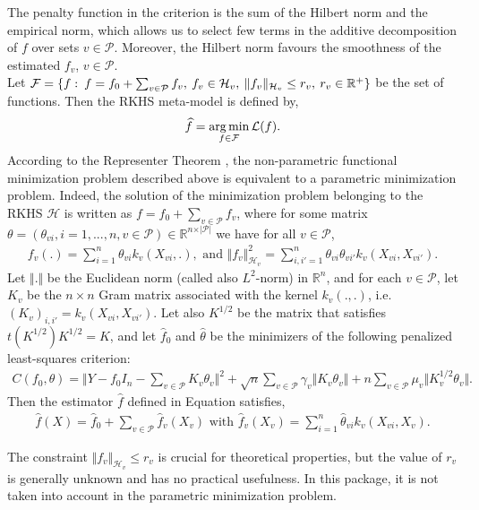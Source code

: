 The penalty function in the criterion  is the sum of the Hilbert norm and the empirical norm, which allows us to select few terms in the additive decomposition of $f$ over sets $v \in \mathcal{P}$. Moreover, the Hilbert norm favours the smoothness of the estimated $f_v$, $v \in \mathcal{P}$.\\ 
Let $\mathcal{F} = \{ f:\: f=f_{0} + \sum_{v\in \mathcal{P}} f_{v},\: f_v \in \mathcal{H}_{v},\: \|f_v\|_{\mathcal{H}_v} \leq r_v,\:r_v\in\mathbb{R}^{+} \}$ be the set of functions.
Then the RKHS meta-model is defined by,
\begin{equation}
\label{ch3prediction}
\widehat{f}=\operatorname*{arg\,min}_{f\in\mathcal{F}}\mathcal{L}(f).
\end{equation}
According to the Representer Theorem \citep{kimeldorf1970}, the non-parametric functional minimization problem described above is equivalent to a parametric minimization problem. Indeed, the solution of the minimization problem  belonging to the RKHS $\mathcal{H}$ is written as $f=f_0+\sum_{v\in\mathcal{P}}f_v$, where for some matrix $\theta=(\theta_{vi},i=1,...,n,v\in\mathcal{P})\in\mathbb{R}^{n\times\vert\mathcal{P}\vert}$ we have for all $v\in\mathcal{P}$, 
\begin{align}
\label{normhvdef}
f_v(.)=\sum_{i=1}^n\theta_{vi}k_v(X_{vi},.),\mbox{ and }\Vert f_v\Vert^2_{\mathcal{H}_v}=\sum_{i,i'=1}^n\theta_{vi}\theta_{vi'}k_v(X_{vi},X_{vi'}).
\end{align}
Let $\Vert.\Vert$ be the Euclidean norm (called also $L^2$-norm) in $\mathbb{R}^n$, and for each $v\in\mathcal{P}$, let $K_v$ be the $n\times n$ Gram matrix associated with the kernel $k_v(.,.)$, i.e. $(K_v)_{i,i'}=k_v(X_{vi},X_{vi'})$. Let also $K^{1/2}$ be the matrix that satisfies $t(K^{1/2})K^{1/2}=K$, and let $\widehat{f}_0$ and $\widehat{\theta}$ be the minimizers of the following penalized least-squares criterion:
\begin{align*}
C(f_0,\theta)=\Vert Y-f_0 I_n-\sum_{v\in\mathcal{P}}K_v\theta_v\Vert^2+\sqrt{n}\sum_{v\in\mathcal{P}}\gamma_v\Vert K_v\theta_v\Vert+n\sum_{v\in\mathcal{P}}\mu_v\Vert K_v^{1/2}\theta_v\Vert.
\end{align*}
Then the estimator $\widehat{f}$ defined in Equation  satisfies, 
\begin{align*}
\widehat{f}(X)=\widehat{f}_0+\sum_{v\in\mathcal{P}}\widehat{f}_v(X_v)\mbox{ with }\widehat{f}_v(X_v)=\sum_{i=1}^n\widehat{\theta}_{vi}k_v(X_{vi},X_v).
\end{align*}
\begin{rem}  The constraint $\Vert f_v\Vert_{\mathcal{H}_v}\leq r_v$ is crucial for theoretical properties, but the value of $r_v$ is generally unknown and has no practical usefulness. In this package, it is not taken into account in the parametric minimization problem.  
\end{rem}
